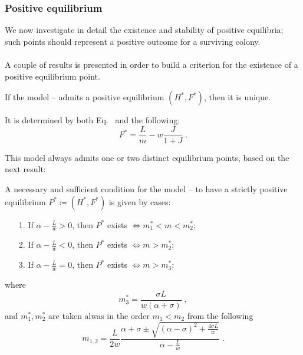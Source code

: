 \subsubsection{Positive equilibrium}
We now investigate in detail the existence and stability of positive equilibria; such points should represent a positive outcome for a surviving colony.

\paragraph{}
A couple of results is presented in order to build a criterion for the existence of a positive equilibrium point.

\begin{teorema}
    If the model -- admits a positive equilibrium $(H^*, F^*)$, then it is unique.

    It is determined by both Eq.~ and the following:
    \begin{equation}
        F^* = \frac{L}{m} - w \frac{J}{1+J} \; .
        \label{eq:kh11posEqF}
    \end{equation}

    \label{teo:exUniqFstarPos}
\end{teorema}

This model always admits one or two distinct equilibrium points, based on the next result:

\begin{teorema}
    A necessary and sufficient condition for the model -- to have a strictly positive equilibrium $P^* \coloneq (H^*, F^*)$ is given by cases:
    \begin{itemize}
        \item[1.] If $\alpha - \frac{L}{w} >0$, then $P^*$ exists $\iff m_1^* < m < m_2^*$;
        \item[2.] If $\alpha - \frac{L}{w} <0$, then $P^*$ exists $\iff m > m_2^*$;
        \item[3.] If $\alpha - \frac{L}{w} =0$, then $P^*$ exists $\iff m > m_3^*$;
    \end{itemize}
    where
    \begin{equation}
        m_3^* = \frac{ \sigma L}{ w (\alpha + \sigma) } \; ,
        \label{eq:FstarPosM3}
    \end{equation}
    and $m_1^*, m_2^*$ are taken alwas in the order $m_1 < m_2$ from the following
    \begin{equation}
        m_{1,2} = \frac{L}{2w} \frac{ \alpha + \sigma \pm \sqrt{ {(\alpha - \sigma)}^2 +\frac{4 \sigma L}{w}  } }
        {\alpha -\frac{L}{w}} \; .
        \label{eq:FstarPosM12}
    \end{equation}

    \label{teo:esistenzPosF}
\end{teorema}


